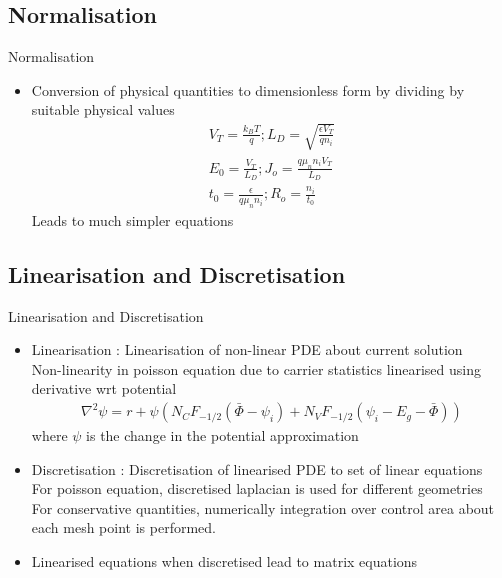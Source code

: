 \documentclass{beamer}
\begin{document}
\subsection{Normalisation}

\begin{frame}{Normalisation}
\begin{itemize}
  \item Conversion of physical quantities to dimensionless form by dividing by suitable physical values\\
		\begin{align*}
		V_T = \frac{k_BT}{q}; L_D = \sqrt{\frac{\epsilon V_T}{q n_i}} \\
		E_0 = \frac{V_T}{L_D} ; J_o = \frac{q \mu_n n_i V_T}{L_D} \\
		t_0 = \frac{\epsilon}{q \mu_n n_i} ; R_o = \frac{n_i}{t_0}
		\tag{6} \label{eq:21} 
		\end{align*}
  		Leads to much simpler equations
\end{itemize}
\end{frame}
  		
\subsection{Linearisation and Discretisation}  		
\begin{frame}{Linearisation and Discretisation}
\begin{itemize}
  \item Linearisation : Linearisation of non-linear PDE about current solution \\
  		Non-linearity in poisson equation due to carrier statistics linearised using derivative wrt potential
  		\begin{align*}
		\nabla^2 \psi = r + \psi ( N_C F_{-1/2}(\bar{\Phi}-\psi_i) + N_V F_{-1/2}(\psi_i-E_g-\bar{\Phi}))
		\tag{7} \label{eq:39}
		\end{align*}
		where $\psi$ is the change in the potential approximation	  
  \item Discretisation : Discretisation of linearised PDE to set of linear equations \\
  		For poisson equation, discretised laplacian is used for different geometries\\
  		For conservative quantities, numerically integration over control area about each mesh point is performed.  	 
  \item Linearised equations when discretised lead to matrix equations  	
\end{itemize}
\end{frame}
\end{document}
